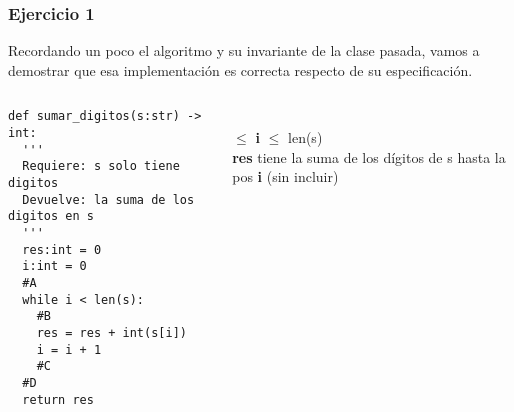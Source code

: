 \newcommand{\docente}{Augusto Gonz\'alez Omahen}

\usepackage{enumitem}


\begin{frame}
\titlepage

\end{frame}

\begin{frame}[fragile]\frametitle{Ejercicio 1}

Recordando un poco el algoritmo y su invariante de la clase pasada, vamos a demostrar que esa implementaci\'on es correcta respecto de su especificaci\'on.%



\begin{columns} 

	\begin{column}{.68\textwidth}
\begin{lstlisting}[style=python]
def sumar_digitos(s:str) -> int:
  '''
  Requiere: s solo tiene digitos 
  Devuelve: la suma de los digitos en s
  '''
  res:int = 0
  i:int = 0
  #A
  while i < len(s):
    #B
    res = res + int(s[i])
    i = i + 1
    #C
  #D
  return res
\end{lstlisting}
	\end{column}

	\begin{column}{.28\textwidth}
		
		\begin{center}
			\medskip
			\\
			 $\leq$ \textbf{i} $\leq$ len(s) \\
			\medskip
			\textbf{res} tiene la suma de los d\'igitos de s hasta la pos \textbf{i} (sin incluir)
		\end{center}		
	\end{column}%
\end{columns}

\end{frame}



